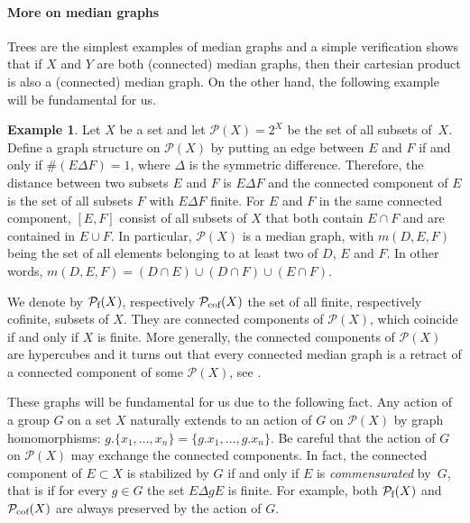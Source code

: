 \documentclass[a4paper]{article}
\theoremstyle{definition}
\newtheorem{exmp}[lem]{Example}
\newcommand*{\powerset}[1]{\mathcal P(#1)}
\newcommand*{\powersetf}[1]{\mathcal P_{\textnormal{f}}(#1)}
\newcommand*{\powersetcof}[1]{\mathcal P_{\textnormal{cof}}(#1)}
\begin{document}
\paragraph{More on median graphs}
Trees are the simplest examples of median graphs and a simple verification shows that if $X$ and $Y$ are both (connected) median graphs, then their cartesian product is also a (connected) median graph.
On the other hand, the following example will be fundamental for us.
%
%
\begin{exmp}\label{Ex:MainMedian}
Let $X$ be a set and let  $\powerset{X}=2^X$ be the set of all subsets of~$X$.
Define a graph structure on $\powerset{X}$ by putting an edge between $E$ and $F$ if and only if $\#(E\Delta F)=1$, where $\Delta$ is the symmetric difference.
Therefore, the distance between two subsets $E$ and $F$ is $E\Delta F$ and
the connected component of $E$ is the set of all subsets $F$ with $E\Delta F$ finite.
For $E$ and $F$ in the same connected component, $[E,F]$ consist of all subsets of $X$ that both contain $E\cap F$ and are contained in $E\cup F$.
In particular, $\powerset{X}$ is a median graph, with $m(D,E,F)$ being the set of all elements belonging to at least two of $D$, $E$ and $F$. In other words, $m(D,E,F)=(D\cap E)\cup(D\cap F)\cup(E\cap F)$.
\end{exmp}
%
%
We denote by $\powersetf{X}$, respectively $\powersetcof{X}$ the set of all finite, respectively cofinite, subsets of $X$.
They are connected components of $\powerset{X}$, which coincide if and only if $X$ is finite.
More generally, the connected components of $\powerset{X}$ are hypercubes and it turns out that every connected median graph is a retract of a connected component of some $\powerset{X}$, see \cite{Bandelt1984}.

These graphs will be fundamental for us due to the following fact.
Any action of a group $G$ on a set $X$ naturally extends to an action of $G$ on $\powerset{X}$ by graph homomorphisms: $g.\{x_1,\dots,x_n\}=\{g.x_1,\dots,g.x_n\}$.
Be careful that the action of $G$ on $\powerset{X}$ may exchange the connected components.
In fact, the connected component of $E\subset X$ is stabilized by $G$ if and only if $E$ is \emph{commensurated} by~$G$, that is if for every $g\in G$ the set $E\Delta gE$ is finite.
For example, both $\powersetf{X}$ and $\powersetcof{X}$ are always preserved by the action of $G$.
\end{document}
